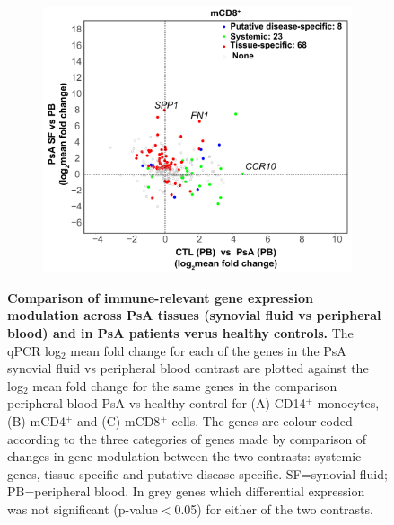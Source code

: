 \begin{figure}[htbp]
\begin{subfigure}{0.45\textwidth}
\caption{\textbf{}}
\end{subfigure}\\
\begin{subfigure}{0.45\textwidth}
\centering
\includegraphics[width=\textwidth]{./Results3/pdfs/PSA_array_correlation_CD8_FC_HVPsA_vs_SFPBPsA}
\caption{\textbf{}}
\end{subfigure}
\caption[Comparison of immune-relevant gene expression modulation across PsA tissues (synovial fluid vs peripheral blood) and in PsA patients verus healthy controls.]{\textbf{Comparison of immune-relevant gene expression modulation across PsA tissues (synovial fluid vs peripheral blood) and in PsA patients verus healthy controls.} The qPCR log${_2}$ mean fold change for each of the genes in the PsA synovial fluid vs peripheral blood contrast are plotted against the log${_2}$ mean fold change for the same genes in the comparison peripheral blood PsA vs healthy control for (A) CD14$^+$ monocytes, (B) mCD4$^+$ and (C) mCD8$^+$ cells. The genes are colour-coded according to the three categories of genes made by comparison of changes in gene modulation between the two contrasts: systemic genes, tissue-specific and putative disease-specific. SF=synovial fluid; PB=peripheral blood. In grey genes which differential expression was not significant (p-value$<$0.05) for either of the two contrasts.}
\label{figure:PSA_PCR_array_HC_FC_correlation}
\end{figure} 



